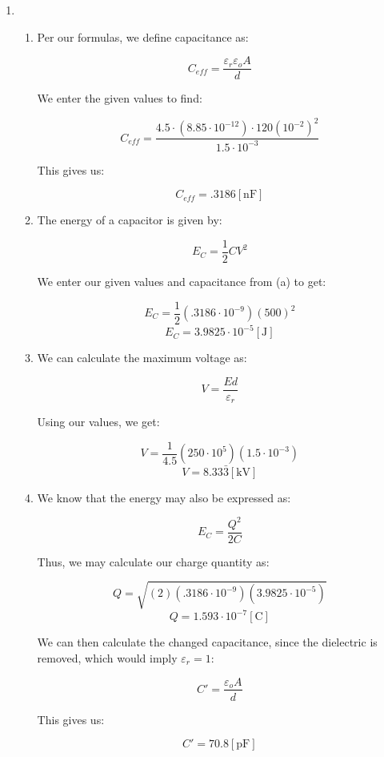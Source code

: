 \begin{enumerate}

  \item

    \begin{enumerate}

      \item Per our formulas, we define capacitance as:

        $$C_{eff}=\frac{\varepsilon_r\varepsilon_oA}{d}$$

        We enter the given values to find:

        $$C_{eff}=\frac{4.5\cdot(8.85\cdot10^{-12}) \cdot120(10^{-2})^2}{1.5\cdot10^{-3}}$$

        This gives us:

        $$\boxed{C_{eff}=.3186[\si{\nano\farad}]}$$

      \item The energy of a capacitor is given by:

        $$E_C=\frac{1}{2}CV^2$$

        We enter our given values and capacitance from (a) to get:

        $$E_C=\frac{1}{2}(.3186\cdot10^{-9})(500)^2$$
        $$\boxed{E_C=3.9825\cdot10^{-5}[\si{\joule}]}$$

      \item We can calculate the maximum voltage as:

        $$V=\frac{Ed}{\varepsilon_r}$$

        Using our values, we get:

        $$V=\frac{1}{4.5}(250\cdot10^{5})(1.5\cdot10^{-3})$$
        $$\boxed{V=8.33\bar{3}[\si{\kilo\volt}]}$$

      \item We know that the energy may also be expressed as:

        $$E_C=\frac{Q^2}{2C}$$

        Thus, we may calculate our charge quantity as:

        $$Q=\sqrt{(2)(.3186\cdot10^{-9})(3.9825\cdot10^{-5})}$$
        $$Q=1.593\cdot10^{-7}[\si{\coulomb}]$$

        We can then calculate the changed capacitance, since the dielectric is removed, which would imply $\varepsilon_r=1$:

        $$C\prime=\frac{\varepsilon_oA}{d}$$

        This gives us:

        $$C\prime=70.8[\si{\pico\farad}]$$


\end{enumerate}
\end{enumerate}
